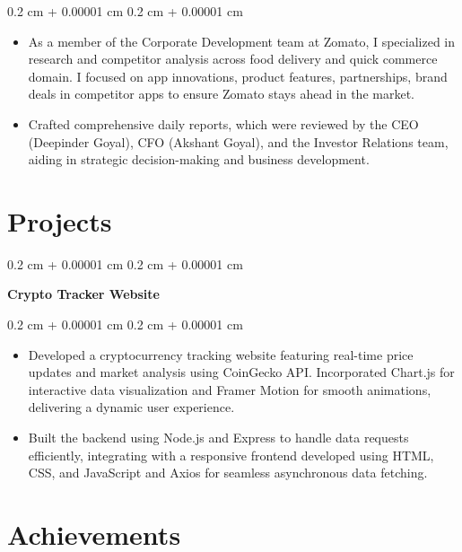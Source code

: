\documentclass[10pt, letterpaper]{article}
\newenvironment{highlights}{
    \begin{itemize}[
        topsep=0.10 cm,
        parsep=0.10 cm,
        partopsep=0pt,
        itemsep=0pt,
        leftmargin=0.4 cm + 10pt
    ]
}{
    \end{itemize}
} %
\newenvironment{onecolentry}{
    \begin{adjustwidth}{
        0.2 cm + 0.00001 cm
    }{
        0.2 cm + 0.00001 cm
    }
}{
    \end{adjustwidth}
} %
\newenvironment{twocolentry}[2][]{
    \onecolentry
    \def\secondColumn{#2}
    \setcolumnwidth{\fill, 4.5 cm}
    \begin{paracol}{2}
}{
    \switchcolumn \raggedleft \secondColumn
    \end{paracol}
    \endonecolentry
} %
\let\hrefWithoutArrow\href
\renewcommand{\href}[2]{\hrefWithoutArrow{#1}{\ifthenelse{\equal{#2}{}}{ }{#2 }\raisebox{.15ex}{\footnotesize \faExternalLink*}}}
\begin{document}
        \vspace{0.10 cm}
        \begin{onecolentry}
            \begin{highlights}
                \item As a member of the Corporate Development team at Zomato, I specialized in research and competitor analysis across food delivery and quick commerce domain. I focused on app innovations, product features, partnerships, brand deals in competitor apps to ensure Zomato stays ahead in the market.
                \item Crafted comprehensive daily reports, which were reviewed by the CEO (Deepinder Goyal), CFO (Akshant Goyal), and the Investor Relations team, aiding in strategic decision-making and business development.
            \end{highlights}
        \end{onecolentry}

\section{Projects}

        
        \begin{twocolentry}{
    \textit{\href{https://github.com/ssganesh035/Crypto-Tracker}{Github}}}
    \textbf{Crypto Tracker Website} 
\end{twocolentry}

        \vspace{0.10 cm}
        \begin{onecolentry}
            \begin{highlights}
                \item Developed a cryptocurrency tracking website featuring real-time price updates and market analysis using CoinGecko API. Incorporated Chart.js for interactive data visualization and Framer Motion for smooth animations, delivering a dynamic user experience.
                \item Built the backend using Node.js and Express to handle data requests efficiently, integrating with a responsive frontend developed using HTML, CSS, and JavaScript and Axios for seamless asynchronous data fetching.
            \end{highlights}
        \end{onecolentry}



\section{Achievements}
\end{document}
